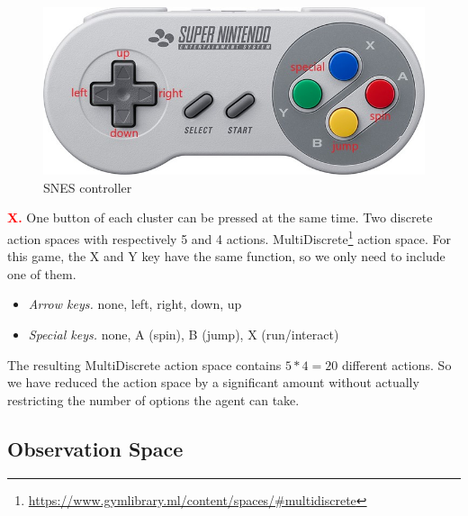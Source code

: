 \documentclass{article}
\begin{document}
    \begin{figure}[ht]
        \centering
        \includegraphics[width=.75\textwidth]{snes-controller-annot}
        \caption{SNES controller}
        \label{fig:snes-controller}
    \end{figure}

    \textbf{\textcolor{red}{X.}}
    One button of each cluster can be pressed at the same time.
    Two discrete action spaces with respectively 5 and 4 actions.
    MultiDiscrete\footnote{\url{https://www.gymlibrary.ml/content/spaces/\#multidiscrete}} action space.
    For this game, the X and Y key have the same function, so we only need to include one of them.
    \begin{itemize}
        \item \emph{Arrow keys.} none, left, right, down, up
        \item \emph{Special keys.} none, A (spin), B (jump), X (run/interact)
    \end{itemize}
    The resulting MultiDiscrete action space contains $5*4 = 20$ different actions.
    So we have reduced the action space by a significant amount without actually restricting the number of options the agent can take.
    \subsection{Observation Space}
\end{document}
